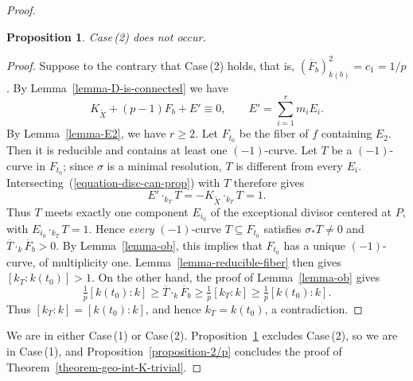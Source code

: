 \documentclass[reqno,oneside]{amsart}
\newtheorem{proposition}[theorem]{Proposition}
\theoremstyle{definition}
\theoremstyle{plain}
\numberwithin{equation}{section}
\begin{document}
\begin{proof}
\begin{proposition}\label{proposition-Case2}%
  Case\,{\rm(2)} does not occur.
\end{proposition}
\begin{proof}
  Suppose to the contrary that Case\,(2) holds, that is, $(\overline F_b)^2_{k(b)}=c_1 =1/p$.
  By Lemma~\ref{lemma-D-is-connected} we have 
  \begin{equation}\label{equation-disc-can-prop}
    K_{\widetilde X} + (p-1)F_b + E'\equiv0,
    \qquad E'=\sum_{i=1}^r m_iE_i .
  \end{equation}
  By Lemma~\ref{lemma-E2}, we have $r \ge 2$.
  Let $F_{t_0}$ be the fiber of $f$ containing $E_2$. 
  Then it is reducible and contains at least one $(-1)$-curve.
  Let $T$ be a $(-1)$-curve in $F_{t_0}$; since $\sigma$ is a minimal resolution, $T$ is different from every $E_i$.
  Intersecting~(\ref{equation-disc-can-prop}) with $T$ therefore gives
  \[
    E'\cdot_{k_T} T= - K_{\widetilde X} \cdot_{k_T} T = 1 .
  \]
  Thus $T$ meets exactly one component $E_{i_0}$ of the exceptional divisor centered at $P$, with $E_{i_0}\cdot_{k_T} T=1$.
  Hence \emph{every} $(-1)$-curve $T\subseteq F_{t_0}$ satisfies $\sigma_*T\ne0$ and $\overline T\cdot_k\overline F_b>0$.
  By Lemma~\ref{lemma-ob}, this implies that $F_{t_0}$ has a unique $(-1)$-curve, of multiplicity one. 
  Lemma~\ref{lemma-reducible-fiber} then gives $[k_T:k(t_0)]>1$.
  On the other hand, the proof of Lemma~\ref{lemma-ob} gives
  \[
    \tfrac1p[k(t_0):k]\ge \overline T\cdot_k\overline F_b
    \ge\tfrac1p[k_T:k]\ge\tfrac1p[k(t_0):k].
  \]
  Thus $[k_T:k]=[k(t_0):k]$, and hence $k_T=k(t_0)$, a contradiction.
\end{proof}

  We are in either Case\,(1) or Case\,(2).
  Proposition~\ref{proposition-Case2} excludes Case\,(2), so we are in Case\,(1), and Proposition~\ref{proposition-2/p} concludes the proof of Theorem~\ref{theorem-geo-int-K-trivial}.
\end{proof}
\end{document}
